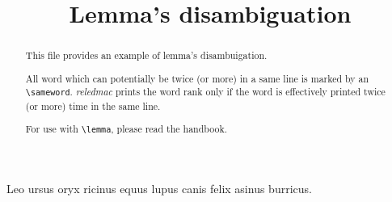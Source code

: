 \documentclass{article}
\begin{document}
\begin{english}
\date{}
\title{Lemma's disambiguation}
\maketitle


\begin{abstract}
This file provides an example of lemma's disambuigation.

All word which can potentially be twice (or more) in a same line is marked by an \verb+\sameword+. \emph{reledmac} prints the word rank only if the word is effectively printed twice (or more) time in the same line.

For use with \verb+\lemma+, please read the handbook.

\end{abstract}
\end{english}





\beginnumbering
\pstart
Leo  ursus  oryx  ricinus  equus 
lupus  canis  felix  asinus  burricus.

\pend
\endnumbering
\end{document}
